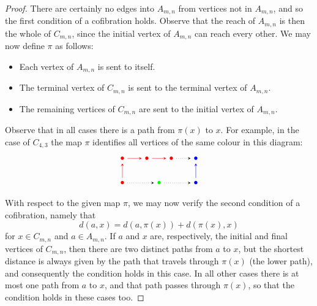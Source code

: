 \documentclass[a4paper, 11 pt, oneside, reqno]{amsart}
\numberwithin{lemma}{section}
\theoremstyle{definition}
\begin{document}
\begin{proof}
    There are certainly no edges into $A_{m,n}$ from vertices
    not in $A_{m,n}$, and so the first condition of a cofibration
    holds.
    Observe that the reach of $A_{m,n}$ is then the whole of
    $C_{m,n}$, since the initial vertex of $A_{m,n}$ can
    reach every other.
    We may now define $\pi$ as follows:
    \begin{itemize}
        \item Each vertex of $A_{m,n}$ is sent to itself.
        \item The terminal vertex of $C_{m,n}$
        is sent to the terminal vertex of $A_{m,n}$.
        \item The remaining vertices of $C_{m,n}$ are sent to the initial vertex of $A_{m,n}$.
    \end{itemize}
    Observe that in all cases there is a path from $\pi(x)$
    to $x$.
    For example, in the case of $C_{4,3}$ the map $\pi$ 
    identifies all vertices of the same colour in this diagram:
    \[
        \begin{tikzpicture}[baseline=0]
            \node[red](x) at (0,0) {$\bullet$};
            \node[blue](y) at (3,1) {$\bullet$};
    
            \node[red] (a2) at (0,1) {$\bullet$};
            \node[red] (a3) at (1,1) {$\bullet$};
            \node[red] (a4) at (2,1) {$\bullet$};
    
            \node[green] (b2) at (1.5,0) {$\bullet$};
            \node[blue] (b3) at (3,0) {$\bullet$};
            
            \draw[red,-stealth] (x) -- (a2);
            \draw[red,-stealth] (a2) -- (a3);
            \draw[red,-stealth] (a3) -- (a4);
            \draw[dotted,-stealth] (a4) -- (y);
    
            \draw[dotted,-stealth] (x) -- (b2);
            \draw[dotted,-stealth] (b2) -- (b3);
            \draw[blue,-stealth] (b3) -- (y);
        \end{tikzpicture}
    \]
    
    With respect to the given map $\pi$, we may now verify
    the second condition of a cofibration, namely that
    \[
        d(a,x)=d(a,\pi(x))+ d(\pi(x),x)
    \]
    for $x\in C_{m,n}$ and $a\in A_{m,n}$.
    If $a$ and $x$ are, respectively, the initial and final 
    vertices of $C_{m,n}$, then there are two distinct paths
    from $a$ to $x$, but the shortest distance is always given
    by the path that travels through $\pi(x)$ (the lower path),
    and consequently the condition holds in this case.
    In all other cases there is at most one path
    from $a$ to $x$, and that path passes through $\pi(x)$,
    so that the condition holds in these cases too.
\end{proof}
\end{document}
